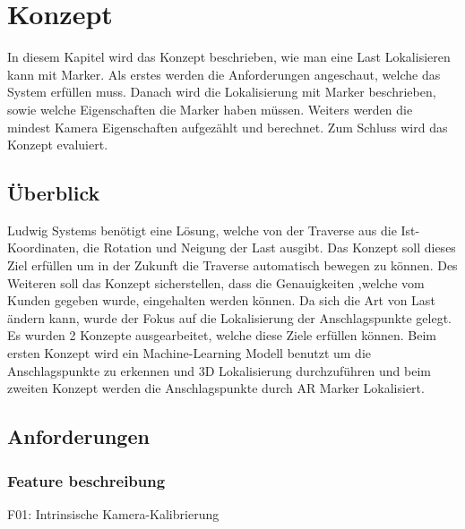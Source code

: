 \section{Konzept}

In diesem Kapitel wird das Konzept beschrieben, wie man eine Last Lokalisieren kann mit Marker.
Als erstes werden die Anforderungen angeschaut, welche das System erfüllen muss. 
Danach wird die Lokalisierung mit Marker beschrieben, sowie welche Eigenschaften die Marker haben müssen.
Weiters werden die mindest Kamera Eigenschaften aufgezählt und berechnet.
Zum Schluss wird das Konzept evaluiert.

\subsection{Überblick}
Ludwig Systems benötigt eine Lösung, welche von der Traverse aus die Ist-Koordinaten, die Rotation und Neigung der Last ausgibt. Das Konzept soll dieses Ziel erfüllen um in der Zukunft die Traverse automatisch bewegen zu können. Des Weiteren soll das Konzept sicherstellen, dass die Genauigkeiten ,welche vom Kunden gegeben wurde, eingehalten werden können. 
Da sich die Art von Last ändern kann, wurde der Fokus auf die Lokalisierung der Anschlagspunkte gelegt. 
Es wurden 2 Konzepte ausgearbeitet, welche diese Ziele erfüllen können. Beim ersten Konzept wird ein Machine-Learning Modell benutzt um die Anschlagspunkte zu erkennen und 3D Lokalisierung durchzuführen und beim zweiten Konzept werden die Anschlagspunkte durch AR Marker 
Lokalisiert.

\subsection{Anforderungen}\label{requirements}

\subsubsection{Feature beschreibung}


F01: Intrinsische Kamera-Kalibrierung


